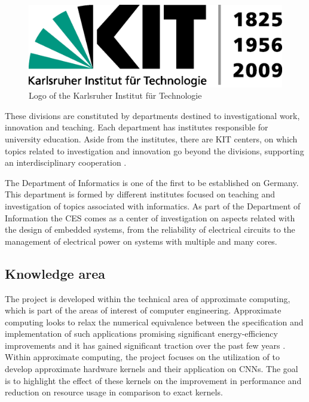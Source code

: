 \begin{figure}
    \includegraphics[width=\linewidth]{fig/kitlogo.eps}
    \caption{Logo of the Karlsruher Institut für Technologie \cite{kitlogo}}
    \label{fig:kitlogo}
\end{figure}

These divisions are constituted by departments destined to investigational work, innovation and teaching.
Each department has institutes responsible for university education. Aside from the institutes, there are
KIT centers, on which topics related to investigation and innovation go beyond the divisions, supporting
an interdisciplinary cooperation \cite{kitorg}. 


The Department of Informatics is one of the first to be established on Germany. This department is formed
by different institutes focused on teaching and investigation of topics associated with informatics. As
part of the Department of Information the CES comes as a center of investigation on aspects related
with the design of embedded systems, from the reliability of electrical circuits to the management of
electrical power on systems with multiple and many cores.

\subsection{Knowledge area}

The project is developed within the technical area of approximate computing, which is part of the areas
of interest of computer engineering. Approximate computing looks to relax the numerical equivalence 
between the specification and implementation of such applications promising significant 
energy-efficiency improvements and it has gained significant traction over the past few years \cite{surveyqu}. Within
approximate computing, the project focuses on the utilization of \intelOCL  to develop approximate hardware
kernels and their application on CNNs. The goal is to highlight the effect of these kernels on the improvement in 
performance and reduction on resource usage in comparison to exact kernels.

